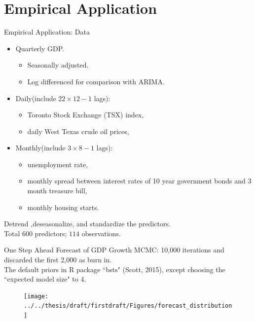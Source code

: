 \documentclass[14pt,xcolor=dvipsnames]{beamer}
\begin{document}



\section{Empirical Application}



\begin{frame}{Empirical Application: Data}



\begin{itemize}
	
	\item Quarterly GDP.
	 \begin{itemize}
		\item Seasonally adjusted. 
	    \item Log differenced for comparison with ARIMA. 
	\end{itemize}
	\item Daily(include $22 \times 12-1$ lags): 
	\begin{itemize}
		\item Toronto Stock Exchange (TSX) index, 
		\item daily West Texas crude oil prices,
	\end{itemize} 
	\item Monthly(include $3\times8 -1$ lags):
	
	\begin{itemize}
		\item unemployment rate, 
		\item monthly spread between interest rates of 10 year government bonds and 3 month treasure bill,
		\item monthly housing starts.
		
	\end{itemize} 
\end{itemize}
Detrend ,deseasonalize, and standardize the predictors.\\
Total $600$ predictors; $114$ observations.
	
\end{frame}


\begin{frame}{One Step Ahead Forecast of GDP Growth}
MCMC: 10,000 iterations and discarded the first 2,000 as burn in. 
\\The default priors in R package ``bsts" (Scott, 2015), except choosing the ``expected model size" to 4.  
\begin{figure}
\centering
\texttt{[image: ../../thesis/draft/firstdraft/Figures/forecast\_distribution]}
\label{fig:forecast_distribution}
\end{figure}

\end{frame}
\end{document}
